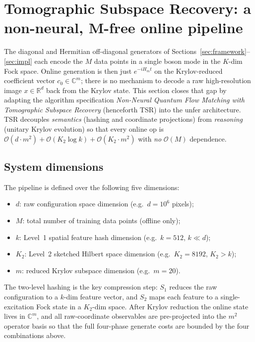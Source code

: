 \documentclass[11pt, a4paper]{article}
\newcommand{\Rset}{\mathbb{R}}
\newcommand{\Cset}{\mathbb{C}}
\begin{document}
\section{Tomographic Subspace Recovery: a non-neural, M-free online pipeline}
\label{sec:tomographic}

The diagonal and Hermitian off-diagonal generators of
Sections~\ref{sec:framework}--\ref{sec:impl} each encode the $M$ data points
in a single boson mode in the $K$-dim Fock space. Online generation is then
just $e^{-iH_m t}$ on the Krylov-reduced coefficient vector $c_0\in\Cset^m$;
there is no mechanism to decode a raw high-resolution image $x\in\Rset^d$
back from the Krylov state. This section closes that gap by adapting the
algorithm specification \emph{Non-Neural Quantum Flow Matching with Tomographic
Subspace Recovery} (henceforth TSR) into the unfer architecture. TSR
decouples \emph{semantics} (hashing and coordinate projections) from
\emph{reasoning} (unitary Krylov evolution) so that every online op is
$\mathcal{O}(d\cdot m^2)+\mathcal{O}(K_2\log k)+\mathcal{O}(K_2\cdot m^2)$
with \emph{no} $\mathcal{O}(M)$ dependence.

\subsection{System dimensions}

The pipeline is defined over the following five dimensions:
\begin{itemize}
\item $d$: raw configuration space dimension (e.g.\ $d=10^6$ pixels);
\item $M$: total number of training data points (offline only);
\item $k$: Level~1 spatial feature hash dimension (e.g.\ $k=512$, $k\ll d$);
\item $K_2$: Level~2 sketched Hilbert space dimension (e.g.\ $K_2=8192$, $K_2>k$);
\item $m$: reduced Krylov subspace dimension (e.g.\ $m=20$).
\end{itemize}
The two-level hashing is the key compression step: $S_1$ reduces the raw
configuration to a $k$-dim feature vector, and $S_2$ maps each feature to a
single-excitation Fock state in a $K_2$-dim space. After Krylov reduction the
online state lives in $\Cset^m$, and all raw-coordinate observables are
pre-projected into the $m^2$ operator basis so that the full four-phase
generate costs are bounded by the four combinations above.
\end{document}
